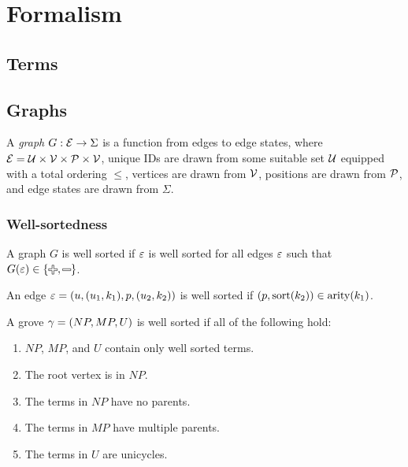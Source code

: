 \section{Formalism}


\subsection{Terms}

\figureTermSyntaxContent


\subsection{Graphs}

\begin{definition}
  A \emph{graph} $G : \E \rightarrow \Sigma$ is a function from edges to edge states,
  where $\E = \U \times \V \times \P \times \V$,
  unique IDs are drawn from some suitable set $\U$ equipped with a total ordering $\leq$,
  vertices are drawn from $\V$,
  positions are drawn from $\P$,
  and edge states are drawn from $\Sigma$.
\end{definition}


\subsubsection{Well-sortedness}

\figureArityContent

\begin{definition}
  A graph $G$ is well sorted if $\e$ is well sorted
  for all edges $\e$ such that $G(\e) \in \{\Plus, \Minus\}$.
\end{definition}

\begin{definition}
  An edge $\e = (u, (u_1, k_1), p, (u_2, k_2))$ is well sorted
  if $(p, \sort(k_2)) \in \arity(k_1)$.
\end{definition}

\begin{definition}
  A grove $\Grove = (NP, MP, U)$ is well sorted if all of the following hold:
  \begin{enumerate}
    \item $NP$, $MP$, and $U$ contain only well sorted terms.
    \item The root vertex is in $NP$.
    \item The terms in $NP$ have no parents.
    \item The terms in $MP$ have multiple parents.
    \item The terms in $U$ are unicycles.
  \end{enumerate}
\end{definition}

